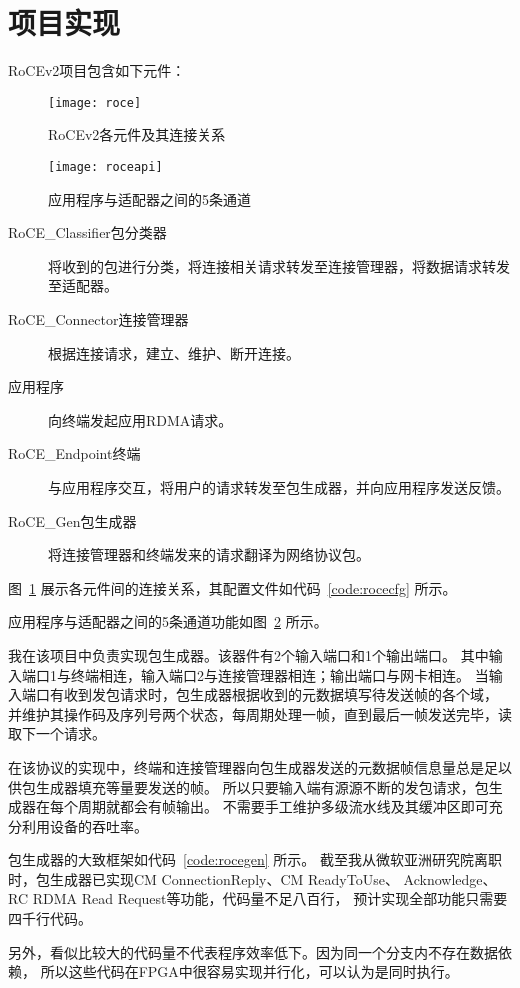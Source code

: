\section{项目实现}
RoCEv2项目包含如下元件：
\begin{figure}[htbp]
\centering
\texttt{[image: roce]}
\caption{RoCEv2各元件及其连接关系} \label{fig:roce}
\end{figure}



\begin{figure}[htbp]
\centering
\texttt{[image: roceapi]}
\caption{应用程序与适配器之间的5条通道} \label{fig:roceapi}
\end{figure}

\begin{description}
\item[RoCE\_Classifier包分类器]将收到的包进行分类，将连接相关请求转发至连接管理器，将数据请求转发至适配器。
\item[RoCE\_Connector连接管理器]根据连接请求，建立、维护、断开连接。
\item[应用程序]向终端发起应用RDMA请求。
\item[RoCE\_Endpoint终端]与应用程序交互，将用户的请求转发至包生成器，并向应用程序发送反馈。
\item[RoCE\_Gen包生成器]将连接管理器和终端发来的请求翻译为网络协议包。
\end{description}

图~\ref{fig:roce} 展示各元件间的连接关系，其配置文件如代码~\ref{code:rocecfg} 所示。

应用程序与适配器之间的5条通道功能如图~\ref{fig:roceapi} 所示。

我在该项目中负责实现包生成器。该器件有2个输入端口和1个输出端口。
其中输入端口1与终端相连，输入端口2与连接管理器相连；输出端口与网卡相连。
当输入端口有收到发包请求时，包生成器根据收到的元数据填写待发送帧的各个域，
并维护其操作码及序列号两个状态，每周期处理一帧，直到最后一帧发送完毕，读取下一个请求。

在该协议的实现中，终端和连接管理器向包生成器发送的元数据帧信息量总是足以供包生成器填充等量要发送的帧。
所以只要输入端有源源不断的发包请求，包生成器在每个周期就都会有帧输出。
不需要手工维护多级流水线及其缓冲区即可充分利用设备的吞吐率。

包生成器的大致框架如代码~\ref{code:rocegen} 所示。
截至我从微软亚洲研究院离职时，包生成器已实现CM ConnectionReply、CM ReadyToUse、
Acknowledge、RC RDMA Read Request等功能，代码量不足八百行，
预计实现全部功能只需要四千行代码。

另外，看似比较大的代码量不代表程序效率低下。因为同一个分支内不存在数据依赖，
所以这些代码在FPGA中很容易实现并行化，可以认为是同时执行。

\newpage

